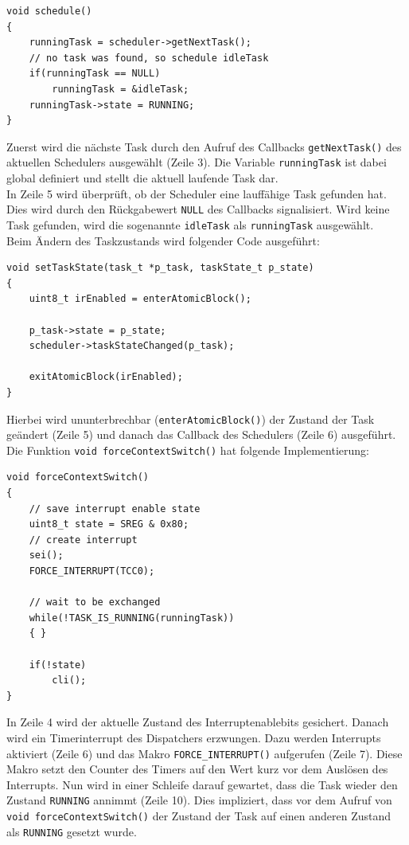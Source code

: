 \documentclass[fontsize=12pt, toc=bibliography, notitlepage]{scrreprt}
\begin{document}
\begin{lstlisting}[title=scheduler.c]
void schedule()
{
	runningTask = scheduler->getNextTask();
	// no task was found, so schedule idleTask
	if(runningTask == NULL)
		runningTask = &idleTask;
	runningTask->state = RUNNING;
}
\end{lstlisting}

Zuerst wird die nächste Task durch den Aufruf des Callbacks \lstinline$getNextTask()$ des aktuellen Schedulers ausgewählt (Zeile 3). Die Variable \lstinline$runningTask$ ist dabei global definiert und stellt die aktuell laufende Task dar.\\
In Zeile 5 wird überprüft, ob der Scheduler eine lauffähige Task gefunden hat. Dies wird durch den Rückgabewert \lstinline$NULL$ des Callbacks signalisiert. Wird keine Task gefunden, wird die sogenannte \lstinline$idleTask$ als \lstinline$runningTask$ ausgewählt.\\
Beim Ändern des Taskzustands wird folgender Code ausgeführt:

\begin{lstlisting}[title=scheduler.c]
void setTaskState(task_t *p_task, taskState_t p_state)
{
	uint8_t irEnabled = enterAtomicBlock();
	
	p_task->state = p_state;
	scheduler->taskStateChanged(p_task);
		
	exitAtomicBlock(irEnabled);	
}
\end{lstlisting}

Hierbei wird ununterbrechbar (\lstinline$enterAtomicBlock()$) der Zustand der Task geändert (Zeile 5) und danach das Callback des Schedulers (Zeile 6) ausgeführt.\\
Die Funktion \lstinline$void forceContextSwitch()$ hat folgende Implementierung:

\begin{lstlisting}[title=scheduler.c]
void forceContextSwitch()
{
	// save interrupt enable state
	uint8_t state = SREG & 0x80;
	// create interrupt
	sei();
	FORCE_INTERRUPT(TCC0);
	
	// wait to be exchanged
	while(!TASK_IS_RUNNING(runningTask))
	{ }
	
	if(!state)
		cli();
}
\end{lstlisting}

In Zeile 4 wird der aktuelle Zustand des Interruptenablebits gesichert. Danach wird ein Timerinterrupt des Dispatchers erzwungen. Dazu werden Interrupts aktiviert (Zeile 6) und das Makro \lstinline$FORCE_INTERRUPT()$ aufgerufen (Zeile 7). Diese Makro setzt den Counter des Timers auf den Wert kurz vor dem Auslösen des Interrupts. Nun wird in einer Schleife darauf gewartet, dass die Task wieder den Zustand \lstinline$RUNNING$ annimmt (Zeile 10). Dies impliziert, dass vor dem Aufruf von \lstinline$void forceContextSwitch()$ der Zustand der Task auf einen anderen Zustand als \lstinline$RUNNING$ gesetzt wurde.
\end{document}
